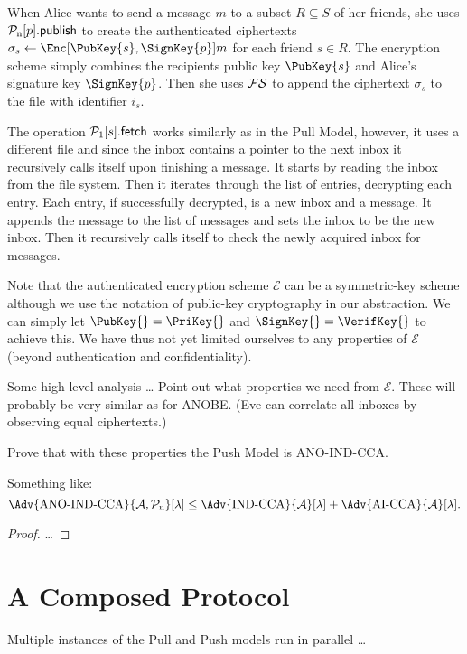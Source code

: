 When Alice wants to send a message \(m\) to a subset \(R\subseteq S\) of her 
friends, she uses \(\pnpub{p}\) to create the authenticated ciphertexts 
\(\sigma_s\gets \Enc[\PubKey{s}, \SignKey{p}]{m}\) for each friend \(s\in R\).
The encryption scheme simply combines the recipients public key \(\PubKey{s}\) 
and Alice's signature key \(\SignKey{p}\).
Then she uses \(\FS\) to append the ciphertext \(\sigma_s\) to the file with 
identifier \(i_s\).

The operation \(\pget{s}\) works similarly as in the Pull Model, however, it 
uses a different file and since the inbox contains a pointer to the next inbox 
it recursively calls itself upon finishing a message.
It starts by reading the inbox from the file system.
Then it iterates through the list of entries, decrypting each entry.
Each entry, if successfully decrypted, is a new inbox and a message.
It appends the message to the list of messages and sets the inbox to be the new
inbox.
Then it recursively calls itself to check the newly acquired inbox for 
messages.

Note that the authenticated encryption scheme \(\mathcal{E}\) can be 
a symmetric-key scheme although we use the notation of public-key cryptography 
in our abstraction.
We can simply let \(\PubKey{} = \PriKey{}\) and \(\SignKey{} = \VerifKey{}\) to 
achieve this.
We have thus not yet limited ourselves to any properties of \(\mathcal{E}\) 
(beyond authentication and confidentiality).

Some high-level analysis \dots
Point out what properties we need from \(\mathcal{E}\).
These will probably be very similar as for \ac{ANOBE}.
(Eve can correlate all inboxes by observing equal ciphertexts.)

Prove that with these properties the Push Model is ANO-IND-CCA\@.
\begin{theorem}
  Something like:
  \[\Adv{\text{ANO-IND-CCA}}{\A, \PushOp}[\lambda]\leq 
    \Adv{\text{IND-CCA}}{\A}[\lambda] + \Adv{\text{AI-CCA}}{\A}[\lambda].\]
\end{theorem}
\begin{proof}
  \dots
\end{proof}


\section{A Composed Protocol}
\label{Composed}

Multiple instances of the Pull and Push models run in parallel \dots



